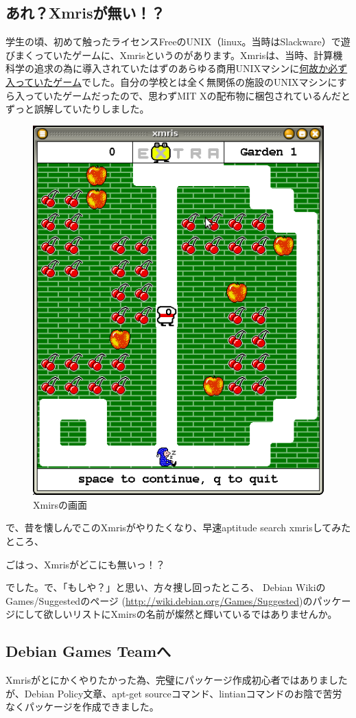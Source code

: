 \documentclass[mingoth,a4paper]{jsarticle}
\begin{document}
\subsection{あれ？Xmrisが無い！？}

 学生の頃、初めて触ったライセンスFreeのUNIX（linux。当時はSlackware）で遊びまくっていたゲームに、Xmrisというのがあります。Xmrisは、当時、計算機科学の追求の為に導入されていたはずのあらゆる商用UNIXマシンに\underline{何故か必ず入っていたゲーム}でした。自分の学校とは全く無関係の施設のUNIXマシンにすら入っていたゲームだったので、思わずMIT Xの配布物に梱包されているんだとずっと誤解していたりしました。

\begin{figure}[H]
\begin{center}
 \includegraphics[height=0.5\hsize] {image201102/xmris-top.png}
 \caption{Xmirsの画面}
\label{fig:xmris-top}
\end{center}
\end{figure}

\newpage

 で、昔を懐しんでこのXmrisがやりたくなり、早速aptitude search xmrisしてみたところ、

 \begin{center}
  \Large{ごはっ、Xmrisがどこにも無いっ！？}
 \end{center}

 でした。で、「もしや？」と思い、方々捜し回ったところ、
Debian WikiのGames/Suggestedのページ
(\url{http://wiki.debian.org/Games/Suggested})のパッケージにして欲しいリストにXmirsの名前が燦然と輝いているではありませんか。


\subsection{Debian Games Teamへ}

 Xmrisがとにかくやりたかった為、完璧にパッケージ作成初心者ではありましたが、Debian Policy文章、apt-get sourceコマンド、lintianコマンドのお陰で苦労なくパッケージを作成できました。
\end{document}
